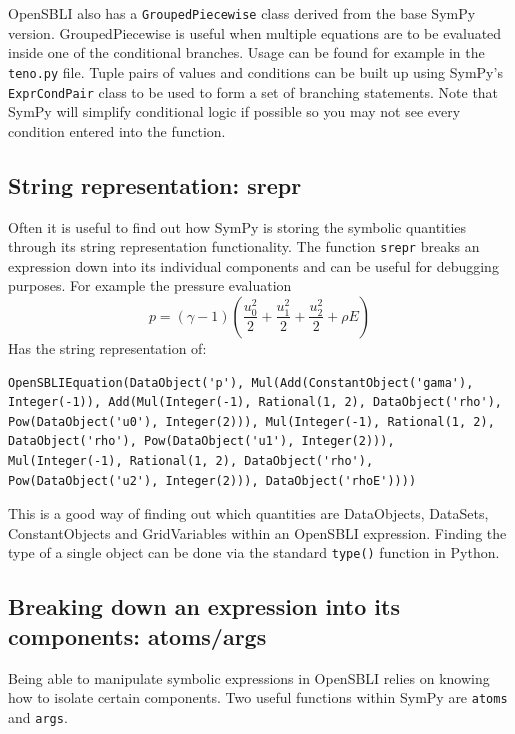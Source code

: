 \documentclass[11pt]{article}
\begin{document}
OpenSBLI also has a \verb|GroupedPiecewise| class derived from the base SymPy version. GroupedPiecewise is useful when multiple equations are to be evaluated inside one of the conditional branches. Usage can be found for example in the \verb|teno.py| file. Tuple pairs of values and conditions can be built up using SymPy's \verb|ExprCondPair| class to be used to form a set of branching statements. Note that SymPy will simplify conditional logic if possible so you may not see every condition entered into the function.

\subsection{String representation: srepr}
Often it is useful to find out how SymPy is storing the symbolic quantities through its string representation functionality. The function \verb|srepr| breaks an expression down into its individual components and can be useful for debugging purposes. For example the pressure evaluation 
\begin{equation}
p = \left(\gamma -1\right) \left(\frac{u_{0}^{2}}{2} + \frac{u_{1}^{2}}{2} + \frac{u_{2}^{2}}{2} + \rho E\right)
\end{equation}
Has the string representation of:
\begin{lstlisting}
OpenSBLIEquation(DataObject('p'), Mul(Add(ConstantObject('gama'), Integer(-1)), Add(Mul(Integer(-1), Rational(1, 2), DataObject('rho'), Pow(DataObject('u0'), Integer(2))), Mul(Integer(-1), Rational(1, 2), DataObject('rho'), Pow(DataObject('u1'), Integer(2))), Mul(Integer(-1), Rational(1, 2), DataObject('rho'), Pow(DataObject('u2'), Integer(2))), DataObject('rhoE'))))
\end{lstlisting}
This is a good way of finding out which quantities are DataObjects, DataSets, ConstantObjects and GridVariables within an OpenSBLI expression. Finding the type of a single object can be done via the standard \verb|type()| function in Python.

\subsection{Breaking down an expression into its components: atoms/args}
Being able to manipulate symbolic expressions in OpenSBLI relies on knowing how to isolate certain components. Two useful functions within SymPy are \verb|atoms| and \verb|args|.
\end{document}
